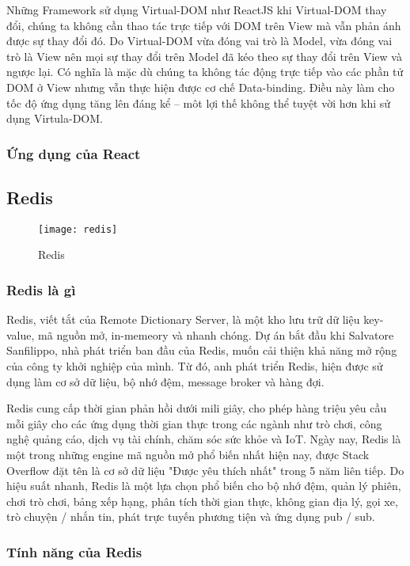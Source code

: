 Những Framework sử dụng Virtual-DOM như ReactJS khi Virtual-DOM thay đổi, chúng ta không cần thao tác trực tiếp với DOM trên View mà vẫn phản ánh được sự thay đổi đó. Do Virtual-DOM vừa đóng vai trò là Model, vừa đóng vai trò là View nên mọi sự thay đổi trên Model đã kéo theo sự thay đổi trên View và ngược lại. Có nghĩa là mặc dù chúng ta không tác động trực tiếp vào các phần tử DOM ở View nhưng vẫn thực hiện được cơ chế Data-binding. Điều này làm cho tốc độ ứng dụng tăng lên đáng kể – môt lợi thế không thể tuyệt vời hơn khi sử dụng Virtula-DOM.

\subsubsection{Ứng dụng của React}

\subsection{Redis}

\begin{figure}[H]
	\centering
	\texttt{[image: redis]}
	\caption{Redis}
\end{figure}

\subsubsection{Redis là gì}

Redis, viết tắt của Remote Dictionary Server, là một kho lưu trữ dữ liệu key-value, mã nguồn mở, in-memeory và nhanh chóng. Dự án bắt đầu khi Salvatore Sanfilippo, nhà phát triển ban đầu của Redis, muốn cải thiện khả năng mở rộng của công ty khởi nghiệp của mình. Từ đó, anh phát triển Redis, hiện được sử dụng làm cơ sở dữ liệu, bộ nhớ đệm, message broker và hàng đợi.

Redis cung cấp thời gian phản hồi dưới mili giây, cho phép hàng triệu yêu cầu mỗi giây cho các ứng dụng thời gian thực trong các ngành như trò chơi, công nghệ quảng cáo, dịch vụ tài chính, chăm sóc sức khỏe và IoT. Ngày nay, Redis là một trong những engine mã nguồn mở phổ biến nhất hiện nay, được Stack Overflow đặt tên là cơ sở dữ liệu "Được yêu thích nhất" trong 5 năm liên tiếp. Do hiệu suất nhanh, Redis là một lựa chọn phổ biến cho bộ nhớ đệm, quản lý phiên, chơi trò chơi, bảng xếp hạng, phân tích thời gian thực, không gian địa lý, gọi xe, trò chuyện / nhắn tin, phát trực tuyến phương tiện và ứng dụng pub / sub.

\subsubsection{Tính năng của Redis}

